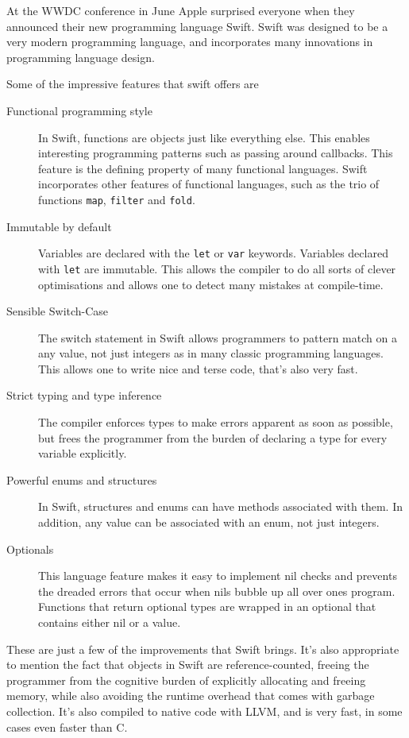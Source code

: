 \documentclass[pdftex, DIV=calc, paper=a4, fontsize=11pt, twocolumn]{scrartcl}	 %
\begin{document}
At the WWDC conference in June Apple surprised everyone when they announced their new programming
language Swift. Swift was designed to be a very modern programming language, and incorporates
many innovations in programming language design.

Some of the impressive features that swift offers are
\begin{description}
    \item[Functional programming style] In Swift, functions are objects just like everything else.
        This enables interesting programming patterns such as passing around callbacks. This feature
        is the defining property of many functional languages. Swift incorporates other features 
        of functional languages, such as the trio of functions \texttt{map}, \texttt{filter} and \texttt{fold}.
    \item[Immutable by default] Variables are declared with the \texttt{let} or \texttt{var}
        keywords. Variables declared with \texttt{let} are immutable. This allows the compiler to
        do all sorts of clever optimisations and allows one to detect many mistakes at compile-time.
    \item[Sensible Switch-Case] The switch statement in Swift allows programmers to pattern match on
        a any value, not just integers as in many classic programming languages. This allows one 
        to write nice and terse code, that's also very fast.
    \item[Strict typing and type inference] The compiler enforces types to make errors apparent as
        soon as possible, but frees the programmer from the burden of declaring a type for every
        variable explicitly.
    \item[Powerful enums and structures] In Swift, structures and enums can have methods associated with them. In addition, any value can be associated with an enum, not just integers.
    \item[Optionals] This language feature makes it easy to implement nil checks and prevents the 
        dreaded errors that occur when nils bubble up all over ones program. Functions that return 
        optional types are wrapped in an optional that contains either nil or a value. 
\end{description}

These are just a few of the improvements that Swift brings. It's also appropriate to mention the fact
that objects in Swift are reference-counted, freeing the programmer from the cognitive burden of
explicitly allocating and freeing memory, while also avoiding the runtime overhead that comes with
garbage collection. It's also compiled to native code with LLVM, and is very fast, in some cases even
faster than C.
\end{document}
